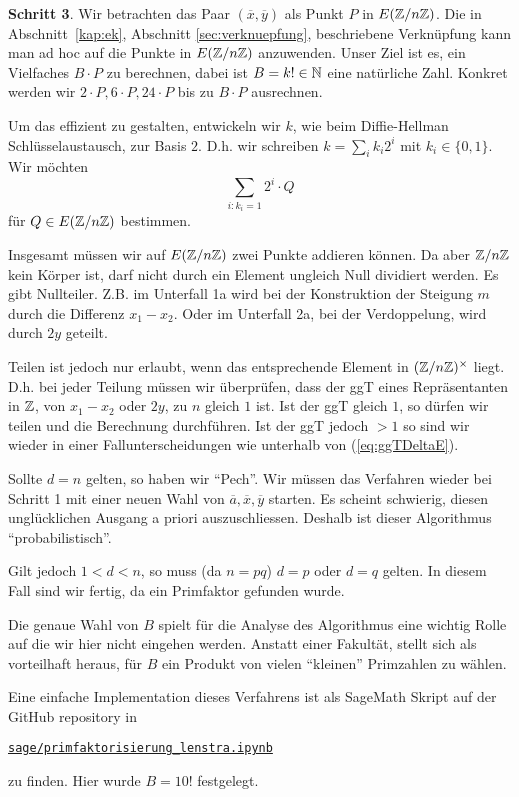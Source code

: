 \bigskip
\textbf{Schritt 3}. Wir betrachten das Paar $(\overline x,\overline y)$
als Punkt $P$ in $E({\mathbb{Z}}/n{\mathbb{Z}})$. 
Die in Abschnitt~\ref{kap:ek}, Abschnitt \ref{sec:verknuepfung},
beschriebene Verknüpfung kann man
ad hoc auf die  
Punkte in  $E({\mathbb{Z}}/n{\mathbb{Z}})$ anzuwenden.
Unser Ziel ist es, ein Vielfaches $B \cdot P$ zu berechnen, dabei ist
$B=k!\in{\mathbb{N}}$ eine natürliche Zahl. Konkret werden wir $2\cdot P,
6\cdot P, 24\cdot P$  bis zu $B \cdot P$ ausrechnen. 

Um das effizient zu gestalten, entwickeln wir $k$, wie beim
Diffie-Hellman Schlüsselaustausch, zur Basis $2$. D.h. wir schreiben
$k=\sum_{i} k_i 2^i$ mit
$k_{i}\in \{0,1\}$. Wir möchten 
$$
\sum_{i : k_i=1} 2^i \cdot Q
$$
für $Q\in E({\mathbb{Z}}/n{\mathbb{Z}})$ bestimmen.

Insgesamt müssen wir auf $E({\mathbb{Z}}/n{\mathbb{Z}})$   zwei Punkte addieren können.
Da aber ${\mathbb{Z}}/n{\mathbb{Z}}$ kein Körper ist, darf nicht durch ein Element
ungleich Null dividiert werden. Es gibt  Nullteiler. 
Z.B. im Unterfall 1a wird bei der Konstruktion der Steigung $m$ durch
die Differenz $x_1-x_2$. Oder im Unterfall 2a, bei der Verdoppelung,
wird durch $2y$ geteilt.

Teilen ist jedoch nur erlaubt, wenn das entsprechende Element in
$({\mathbb{Z}}/n{\mathbb{Z}})^\times$ liegt. D.h. bei jeder Teilung müssen wir
überprüfen, dass der ggT eines Repräsentanten in ${\mathbb{Z}}$, von $x_1-x_2$ oder $2y$,
zu $n$ gleich $1$ ist. Ist der ggT gleich $1$, so dürfen wir teilen
und die Berechnung durchführen.
Ist der ggT jedoch $>1$ so sind wir wieder in einer
Fallunterscheidungen wie unterhalb von (\ref{eq:ggTDeltaE}).

Sollte $d=n$ gelten, so haben wir ``Pech''. Wir müssen das Verfahren wieder
bei Schritt 1 mit einer neuen Wahl von $\overline a,\overline
x,\overline y$ starten. Es scheint schwierig, diesen unglücklichen
Ausgang a priori auszuschliessen. Deshalb ist dieser Algorithmus
``probabilistisch''.

Gilt jedoch $1<d<n$, so muss (da $n=pq$) $d=p$ oder $d=q$ gelten. In diesem
Fall sind wir fertig, da ein Primfaktor gefunden wurde.

\bigskip

Die genaue Wahl von $B$ spielt für die Analyse des Algorithmus eine
wichtig Rolle auf die wir hier nicht eingehen werden. Anstatt einer
Fakultät, stellt sich als vorteilhaft heraus, für $B$ ein Produkt von
vielen ``kleinen'' Primzahlen zu wählen.

Eine einfache Implementation dieses Verfahrens ist als SageMath Skript
auf der GitHub repository in
\begin{center}
    \href{https://github.com/philipphabegger/ElliptischeKurvenDMK/blob/master/sage/primfaktorisierung_lenstra.ipynb}{\texttt{sage/primfaktorisierung\_lenstra.ipynb}}
\end{center}
zu finden. Hier wurde $B=10!$ festgelegt.






